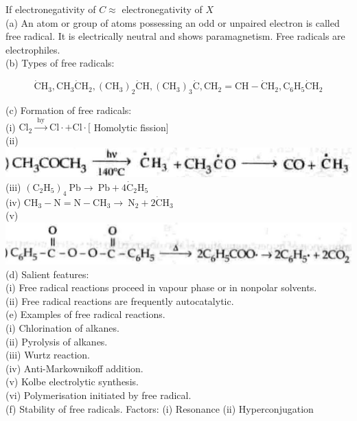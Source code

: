 \documentclass[10pt]{article}
\begin{document}
If electronegativity of $C \approx$ electronegativity of $X$\\
(a) An atom or group of atoms possessing an odd or unpaired electron is called free radical. It is electrically neutral and shows paramagnetism. Free radicals are electrophiles.\\
(b) Types of free radicals:

$$
\dot{\mathrm{C}} \mathrm{H}_{3}, \mathrm{CH}_{3} \dot{\mathrm{C}} \mathrm{H}_{2},\left(\mathrm{CH}_{3}\right)_{2} \dot{\mathrm{C}} \mathrm{H},\left(\mathrm{CH}_{3}\right)_{3} \dot{\mathrm{C}}, \mathrm{CH}_{2}=\mathrm{CH}-\dot{\mathrm{C}} \mathrm{H}_{2}, \mathrm{C}_{6} \mathrm{H}_{5} \dot{\mathrm{C}} \mathrm{H}_{2}
$$

(c) Formation of free radicals:\\
(i) $\mathrm{Cl}_{2} \xrightarrow{\text { hy }} \mathrm{Cl} \cdot+\mathrm{Cl} \cdot[$ Homolytic fission]\\
(ii)\\
\includegraphics[max width=\textwidth, center]{2025_01_28_8470952b98110cec3aabg-084}\\
(iii) $\left(\mathrm{C}_{2} \mathrm{H}_{5}\right)_{4} \mathrm{~Pb} \longrightarrow \mathrm{~Pb}+4 \dot{\mathrm{C}}_{2} \mathrm{H}_{5}$\\
(iv) $\mathrm{CH}_{3}-\mathrm{N}=\mathrm{N}-\mathrm{CH}_{3} \rightarrow \mathrm{~N}_{2}+2 \dot{\mathrm{C}} \mathrm{H}_{3}$\\
(v)\\
\includegraphics[max width=\textwidth, center]{2025_01_28_8470952b98110cec3aabg-084(3)}\\
(d) Salient features:\\
(i) Free radical reactions proceed in vapour phase or in nonpolar solvents.\\
(ii) Free radical reactions are frequently autocatalytic.\\
(e) Examples of free radical reactions.\\
(i) Chlorination of alkanes.\\
(ii) Pyrolysis of alkanes.\\
(iii) Wurtz reaction.\\
(iv) Anti-Markownikoff addition.\\
(v) Kolbe electrolytic synthesis.\\
(vi) Polymerisation initiated by free radical.\\
(f) Stability of free radicals. Factors: (i) Resonance (ii) Hyperconjugation
\end{document}
